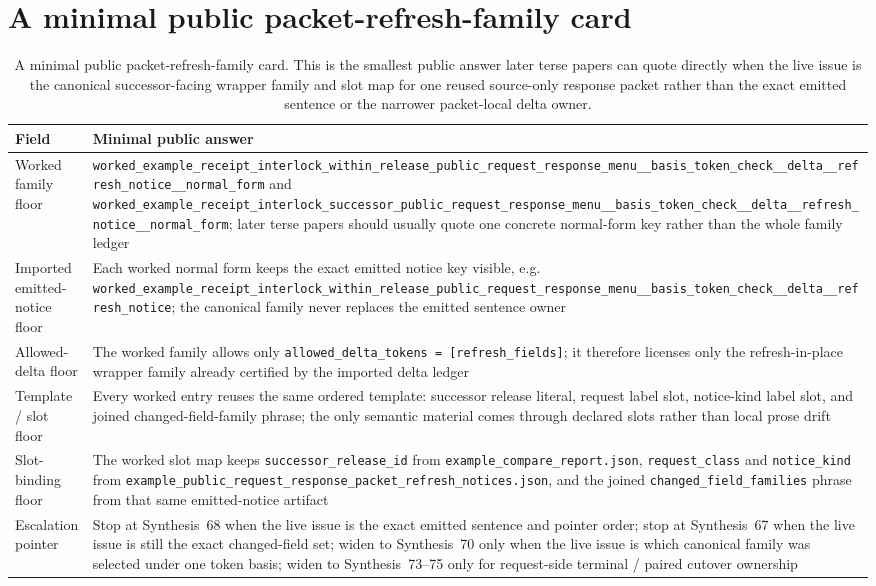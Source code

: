 \documentclass[11pt]{article}
\begin{document}
\section{A minimal public packet-refresh-family card}
\begin{table}[t]
\centering
\small
\begin{tabularx}{\linewidth}{@{}lX@{}}
\toprule
Field & Minimal public answer \\
\midrule
Worked family floor & \nolinkurl{worked_example_receipt_interlock_within_release_public_request_response_menu__basis_token_check__delta__refresh_notice__normal_form} and \nolinkurl{worked_example_receipt_interlock_successor_public_request_response_menu__basis_token_check__delta__refresh_notice__normal_form}; later terse papers should usually quote one concrete normal-form key rather than the whole family ledger \\
Imported emitted-notice floor & Each worked normal form keeps the exact emitted notice key visible, e.g. \nolinkurl{worked_example_receipt_interlock_within_release_public_request_response_menu__basis_token_check__delta__refresh_notice}; the canonical family never replaces the emitted sentence owner \\
Allowed-delta floor & The worked family allows only \nolinkurl{allowed_delta_tokens = [refresh_fields]}; it therefore licenses only the refresh-in-place wrapper family already certified by the imported delta ledger \\
Template / slot floor & Every worked entry reuses the same ordered template: successor release literal, request label slot, notice-kind label slot, and joined changed-field-family phrase; the only semantic material comes through declared slots rather than local prose drift \\
Slot-binding floor & The worked slot map keeps \nolinkurl{successor_release_id} from \nolinkurl{example_compare_report.json}, \nolinkurl{request_class} and \nolinkurl{notice_kind} from \nolinkurl{example_public_request_response_packet_refresh_notices.json}, and the joined \nolinkurl{changed_field_families} phrase from that same emitted-notice artifact \\
Escalation pointer & Stop at Synthesis~68 when the live issue is the exact emitted sentence and pointer order; stop at Synthesis~67 when the live issue is still the exact changed-field set; widen to Synthesis~70 only when the live issue is which canonical family was selected under one token basis; widen to Synthesis~73--75 only for request-side terminal / paired cutover ownership \\
\bottomrule
\end{tabularx}
\caption{A minimal public packet-refresh-family card. This is the smallest public answer later terse papers can quote directly when the live issue is the canonical successor-facing wrapper family and slot map for one reused source-only response packet rather than the exact emitted sentence or the narrower packet-local delta owner.}
\label{tab:minimal-public-packet-refresh-family-card}
\end{table}
\end{document}
